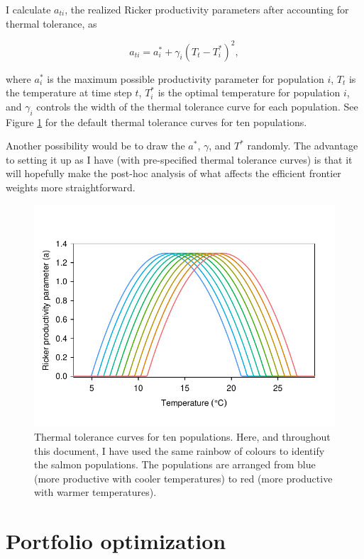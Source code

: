 \documentclass[12pt]{article}
\begin{document}
I calculate $a_{ti}$, the realized Ricker productivity parameters after
accounting for thermal tolerance, as

\begin{equation}
  a_{ti} = a_i^* + \gamma_i (T_t - T_i^*)^2,
\end{equation}

\noindent
where $a_i^*$ is the maximum possible productivity parameter for
population $i$, $T_t$ is the temperature at time step $t$, $T_i^*$ is
the optimal temperature for population $i$, and $\gamma_i$ controls the
width of the thermal tolerance curve for each population. See Figure
\ref{fig:thermal-curves} for the default thermal tolerance curves for
ten populations.

Another possibility would be to draw the $a^*$, $\gamma$, and $T^*$
randomly. The advantage to setting it up as I have (with pre-specified
thermal tolerance curves) is that it will hopefully make the post-hoc
analysis of what affects the efficient frontier weights more
straightforward.

\begin{figure}[htbp]
\centering
\includegraphics{figure/thermal-curves.pdf}
\caption{Thermal tolerance curves for ten populations. Here, and
throughout this document, I have used the same rainbow of colours to
identify the salmon populations. The populations are arranged from blue
(more productive with cooler temperatures) to red (more productive with
warmer temperatures).\label{fig:thermal-curves}}
\end{figure}

\section{Portfolio optimization}
\end{document}
